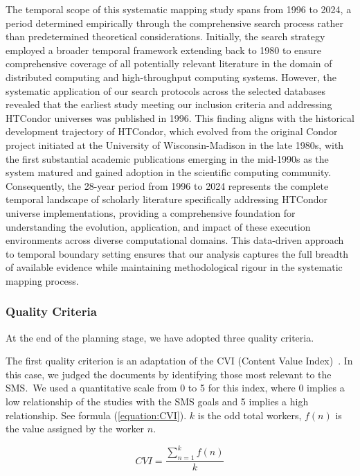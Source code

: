 The temporal scope of this systematic mapping study spans from 1996 to 2024, a period determined empirically through the comprehensive search process rather than predetermined theoretical considerations. Initially, the search strategy employed a broader temporal framework extending back to 1980 to ensure comprehensive coverage of all potentially relevant literature in the domain of distributed computing and high-throughput computing systems. However, the systematic application of our search protocols across the selected databases revealed that the earliest study meeting our inclusion criteria and addressing HTCondor universes was published in 1996. This finding aligns with the historical development trajectory of HTCondor, which evolved from the original Condor project initiated at the University of Wisconsin-Madison in the late 1980s, with the first substantial academic publications emerging in the mid-1990s as the system matured and gained adoption in the scientific computing community. Consequently, the 28-year period from 1996 to 2024 represents the complete temporal landscape of scholarly literature specifically addressing HTCondor universe implementations, providing a comprehensive foundation for understanding the evolution, application, and impact of these execution environments across diverse computational domains. This data-driven approach to temporal boundary setting ensures that our analysis captures the full breadth of available evidence while maintaining methodological rigour in the systematic mapping process.



\subsubsection{Quality Criteria}
At the end of the planning stage, we have adopted three quality criteria.

The first quality criterion is an adaptation of the CVI (Content Value Index)~\cite{Almanasreh2019214, yaghmaei2003content}. In this case, we judged the documents by identifying those most relevant to the SMS.~We used a quantitative scale from 0 to 5 for this index, where 0 implies a low relationship of the studies with the SMS goals and 5 implies a high relationship. See formula (\ref{equation:CVI}). $k$ is the odd total workers, $f(n)$ is the value assigned by the worker $n$.

\begin{equation}
	\label{equation:CVI}
	CVI = \frac{\sum_{n=1}^{k} f(n)}{k}
\end{equation}

